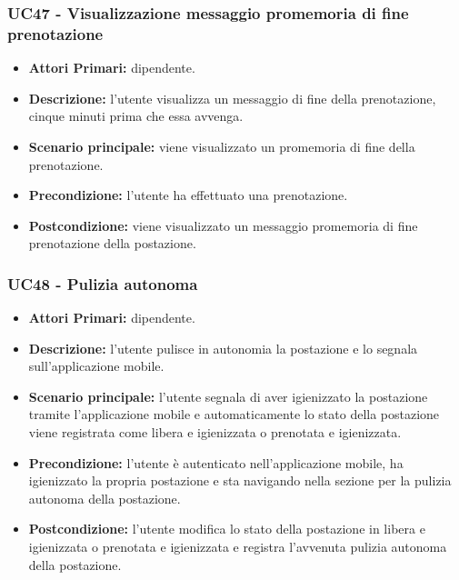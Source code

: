 \subsubsection{ UC47 - Visualizzazione messaggio promemoria di fine prenotazione}
\begin{itemize}
	\item\textbf{Attori Primari:} dipendente.
	\item\textbf{Descrizione:} l’utente visualizza un messaggio di fine della prenotazione, cinque minuti prima che essa avvenga.
	\item\textbf{Scenario principale:} viene visualizzato un promemoria di fine della prenotazione.
	\item\textbf{Precondizione:} l’utente ha effettuato una prenotazione.
	\item\textbf{Postcondizione:} viene visualizzato un messaggio promemoria di fine prenotazione della postazione.
\end{itemize}

\subsubsection{ UC48 - Pulizia autonoma}
\begin{itemize}
	\item\textbf{Attori Primari:} dipendente.
	\item\textbf{Descrizione:} l’utente pulisce in autonomia la postazione e lo segnala sull'applicazione mobile. 	
	\item\textbf{Scenario principale:} l’utente segnala di aver igienizzato la postazione tramite l'applicazione mobile e automaticamente lo stato della postazione viene registrata come libera e igienizzata o prenotata e igienizzata.
	\item\textbf{Precondizione:} l’utente è autenticato nell'applicazione mobile, ha igienizzato la propria postazione e sta navigando nella sezione per la pulizia 
	autonoma della postazione.
	\item\textbf{Postcondizione:} l’utente modifica lo stato della postazione in libera e igienizzata o prenotata e igienizzata e registra l'avvenuta pulizia autonoma della postazione.
\end{itemize}

